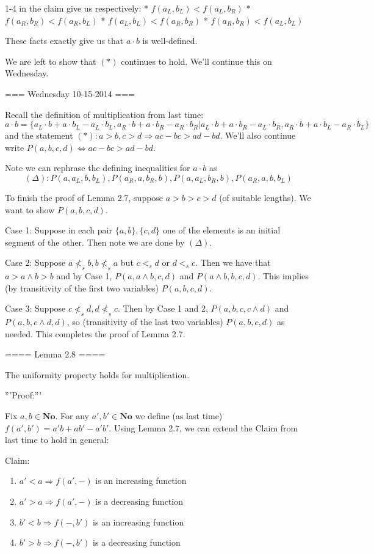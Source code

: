 1-4 in the claim give us respectively:
* $f(a_L, b_L) < f(a_L, b_R)$
* $f(a_R, b_R) < f(a_R, b_L)$
* $f(a_L, b_L) < f(a_R, b_R)$
* $f(a_R, b_R) < f(a_L, b_L)$

These facts exactly give us that $a\cdot b$ is well-defined.

We are left to show that $(*)$ continues to hold. We'll continue this on Wednesday.

=== Wednesday 10-15-2014 ===

Recall the definition of multiplication from last time:
\[
a\cdot b = \{a_L\cdot b + a\cdot b_L - a_L\cdot b_L, a_R\cdot b + a\cdot b_R - a_R\cdot b_R | a_L\cdot b + a\cdot b_R - a_L\cdot b_R, a_R\cdot b + a\cdot b_L - a_R\cdot b_L \}
\]
and the statement $(*): a>b, c>d \Rightarrow ac-bc > ad-bd$. We'll also continue write $P(a,b,c,d)\Leftrightarrow ac - bc > ad - bd$.

Note we can rephrase the defining inequalities for $a\cdot b$ as
\[
(\Delta): P(a,a_L,b,b_L), P(a_R,a,b_R,b), P(a,a_L,b_R,b), P(a_R,a,b,b_L)
\]

To finish the proof of Lemma 2.7, suppose $a>b>c>d$ (of suitable lengths). We want to show $P(a,b,c,d)$.

Case 1:  Suppose in each pair $\{a,b\}, \{c,d\}$ one of the elements is an initial segment of the other. Then note we are done by $(\Delta)$.

Case 2:  Suppose $a \not<_s b, b\not<_s a$ but $c <_s d$ or $d <_s c$. Then we have that $a > a\wedge b > b$ and by Case 1, $P(a,a\wedge b, c, d)$ and $P(a\wedge b, b, c, d)$. This implies (by transitivity of the first two variables) $P(a,b,c,d)$.

Case 3:  Suppose $c \not<_s d, d\not<_s c$. Then by Case 1 and 2, $P(a,b,c,c\wedge d)$ and $P(a,b,c\wedge d, d)$, so (transitivity of the last two variables) $P(a,b,c,d)$ as needed. This completes the proof of Lemma 2.7.

==== Lemma 2.8 ====

The uniformity property holds for multiplication.

'''Proof:'''

Fix $a,b\in \mathbf{No}$. For any $a',b'\in \mathbf{No}$ we define (as last time) $f(a',b') = a'b + ab' - a'b'$. Using Lemma 2.7, we can extend the Claim from last time to hold in general:

Claim:
\begin{enumerate}
\item $a' < a \Rightarrow f(a',-)$ is an increasing function
\item $a' > a \Rightarrow f(a',-)$ is a decreasing function
\item $b' < b \Rightarrow f(-,b')$ is an increasing function
\item $b' > b \Rightarrow f(-,b')$ is a decreasing function
\end{enumerate}

